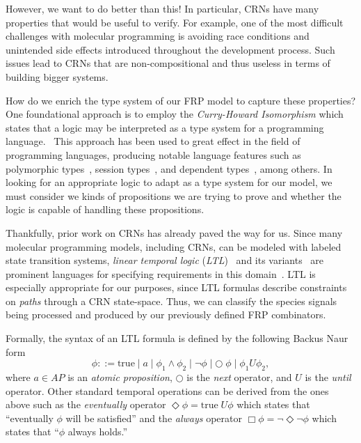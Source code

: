 However, we want to do better than this!
In particular, CRNs have many properties that would be useful to verify.
For example, one of the most difficult challenges with molecular programming is avoiding race conditions and unintended side effects introduced throughout the development process.
Such issues lead to CRNs that are non-compositional and thus useless in terms of building bigger systems.

How do we enrich the type system of our FRP model to capture these properties?
One foundational approach is to employ the \emph{Curry-Howard Isomorphism} which states that a logic may be interpreted as a type system for a programming language.~\cite{sorensen1998}
This approach has been used to great effect in the field of programming languages, producing notable language features such as polymorphic types~\cite{girard1989}, session types~\cite{caires2016}, and dependent types~\cite{xi1999}, among others.
In looking for an appropriate logic to adapt as a type system for our model, we must consider we kinds of propositions we are trying to prove and whether the logic is capable of handling these propositions.

Thankfully, prior work on CRNs has already paved the way for us.
Since many molecular programming models, including CRNs, can be modeled with labeled state transition systems, \emph{linear temporal logic} (\emph{LTL})~\cite{pnueli1997,manna2012temporal,oBaiKat08} and its variants~\cite{donze2010,donze2013,donze2015} are prominent languages for specifying requirements in this domain~\cite{pnueli1997,manna2012temporal,oBaiKat08,cLLLKMS12,cEHKLLL14,jEKLLLM17}.
LTL is especially appropriate for our purposes, since LTL formulas describe constraints on \emph{paths} through a CRN state-space.
Thus, we can classify the species signals being processed and produced by our previously defined FRP combinators.

Formally, the syntax of an LTL formula is defined by the following Backus Naur form
\begin{equation}
    \phi ::= \text{true}
             \mid a 
             \mid \phi_1 \land \phi_2 
             \mid \lnot\phi 
             \mid \bigcirc\;\phi
             \mid \phi_1 U \phi_2,
\end{equation}
where \( a \in AP \) is an \emph{atomic proposition}, \( \bigcirc \) is the \emph{next} operator, and \( U \) is the \emph{until} operator.
Other standard temporal operations can be derived from the ones above such as the \emph{eventually} operator \( \Diamond\phi = \text{true}\; U \phi \) which states that ``eventually \( \phi \) will be satisfied'' and the \emph{always} operator \( \Box\phi = \lnot\Diamond\lnot\phi \) which states that ``\( \phi \) always holds.''

